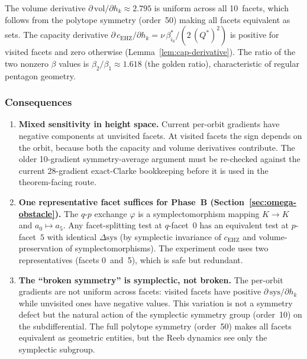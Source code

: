 The volume derivative $\partial\,\mathrm{vol}/\partial h_k \approx 2.795$ is
uniform across all 10~facets,
which follows from the polytope symmetry (order~50) making all
facets equivalent as sets.
The capacity derivative
$\partial\,c_{\mathrm{EHZ}}/\partial h_k
= \nu\,\beta_{i_0}^* / (2\,(Q^*)^2)$
is positive for visited facets and zero otherwise
(Lemma~\ref{lem:cap-derivative}).
The ratio of the two nonzero $\beta$ values is
$\beta_2 / \beta_1 \approx 1.618$ (the golden ratio),
characteristic of regular pentagon geometry.

\subsubsection*{Consequences}

\begin{enumerate}
\item \textbf{Mixed sensitivity in height space.}
  Current per-orbit gradients have negative components at unvisited facets.
  At visited facets the sign depends on the orbit, because both the capacity
  and volume derivatives contribute.
  The older 10-gradient symmetry-average argument must be re-checked against
  the current 28-gradient exact-Clarke bookkeeping before it is used in the
  theorem-facing route.

\item \textbf{One representative facet suffices for Phase~B
  (Section~\ref{sec:omega-obstacle}).}
  The $q$\nobreakdash-$p$ exchange $\varphi$ is a symplectomorphism
  mapping $K \to K$ and $a_0 \mapsto a_5$.
  Any facet-splitting test at $q$-facet~$0$ has an equivalent test at
  $p$-facet~$5$ with identical $\Delta\mathrm{sys}$
  (by symplectic invariance of $c_{\mathrm{EHZ}}$
  and volume-preservation of symplectomorphisms).
  The experiment code uses two representatives (facets 0~and~5), which
  is safe but redundant.

\item \textbf{The ``broken symmetry'' is symplectic, not broken.}
  The per-orbit gradients are not uniform across facets: visited facets
  have positive $\partial\,\mathrm{sys}/\partial h_k$
  while unvisited ones have negative values.
  This variation is not a symmetry defect but the natural action of the
  symplectic symmetry group (order~10) on the subdifferential.
  The full polytope symmetry (order~50) makes all facets equivalent
  as geometric entities, but the Reeb dynamics see only the symplectic
  subgroup.
\end{enumerate}

